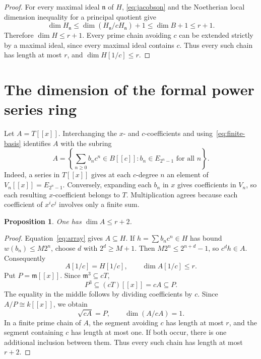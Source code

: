 \documentclass[11pt,reqno]{amsart}
\numberwithin{equation}{section}
\theoremstyle{plain}
\newtheorem{proposition}[theorem]{Proposition}
\theoremstyle{definition}
\theoremstyle{remark}
\newcommand{\m}{\mathfrak m}
\begin{document}
\begin{proof}
For every maximal ideal $\mathfrak n$ of $H$,
\eqref{eq:jacobson} and the Noetherian local dimension inequality
for a principal quotient give
\[
 \dim H_{\mathfrak n}
 \le\dim(H_{\mathfrak n}/cH_{\mathfrak n})+1
 \le\dim B+1\le r+1.
\]
Therefore $\dim H\le r+1$. Every prime chain avoiding $c$ can
be extended strictly by a maximal ideal, since every maximal ideal
contains $c$. Thus every such chain has length at most $r$, and
\mbox{$\dim H[1/c]\le r$}.
\end{proof}

\section{The dimension of the formal power series ring}
\label{sec:dimension}

Let $A=T[[x]]$. Interchanging the $x$- and $c$-coefficients and
using~\eqref{eq:finite-basis} identifies $A$ with the subring
\begin{equation}\label{eq:array}
 A=\left\{\sum_{n\ge0}b_nc^n\in B[[c]]:
                         b_n\in E_{2^n-1}\text{ for all }n\right\}.
\end{equation}
Indeed, a series in $T[[x]]$ gives at each $c$-degree $n$ an
element of $V_n[[x]]=E_{2^n-1}$. Conversely, expanding each $b_n$
in $x$ gives coefficients in $V_n$, so each resulting
$x$-coefficient belongs to $T$. Multiplication agrees because
each coefficient of $x^i c^j$ involves only a finite sum.

\begin{proposition}\label{prop:upper}
One has $\dim A\le r+2$.
\end{proposition}

\begin{proof}
Equation~\eqref{eq:array} gives $A\subseteq H$.
If $h=\sum b_nc^n\in H$ has bound $w(b_n)\le M2^n$, choose
$d$ with $2^d\ge M+1$. Then
$M2^n\le2^{n+d}-1$, so $c^dh\in A$. Consequently
\begin{equation}\label{eq:localization}
 A[1/c]=H[1/c],\qquad\dim A[1/c]\le r.
\end{equation}
Put $P=\m[[x]]$. Since $\m^3\subseteq cT$,
\[
 P^3\subseteq(cT)[[x]]=cA\subseteq P.
\]
The equality in the middle follows by dividing coefficients by
$c$. Since $A/P\cong k[[x]]$, we obtain
\begin{equation}\label{eq:closed-part}
 \sqrt{cA}=P,\qquad\dim(A/cA)=1.
\end{equation}
In a finite prime chain of $A$, the segment avoiding $c$ has
length at most $r$, and the segment containing $c$ has length at
most one. If both occur, there is one additional inclusion between
them. Thus every such chain has length at most $r+2$.
\end{proof}
\end{document}
